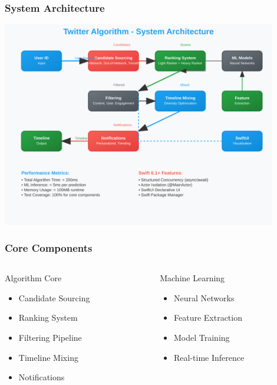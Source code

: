 \documentclass[aspectratio=169]{beamer}
\begin{document}
\begin{frame}
    \frametitle{System Architecture}
    \begin{center}
        \includegraphics[width=0.9\textwidth]{images/system-architecture.svg}
    \end{center}
\end{frame}

\begin{frame}
    \frametitle{Core Components}
    \begin{columns}
        \begin{column}{0.5\textwidth}
            \begin{block}{Algorithm Core}
                \begin{itemize}
                    \item Candidate Sourcing
                    \item Ranking System
                    \item Filtering Pipeline
                    \item Timeline Mixing
                    \item Notifications
                \end{itemize}
            \end{block}
        \end{column}
        \begin{column}{0.5\textwidth}
            \begin{block}{Machine Learning}
                \begin{itemize}
                    \item Neural Networks
                    \item Feature Extraction
                    \item Model Training
                    \item Real-time Inference
                \end{itemize}
            \end{block}
        \end{column}
    \end{columns}
\end{frame}
\end{document}
